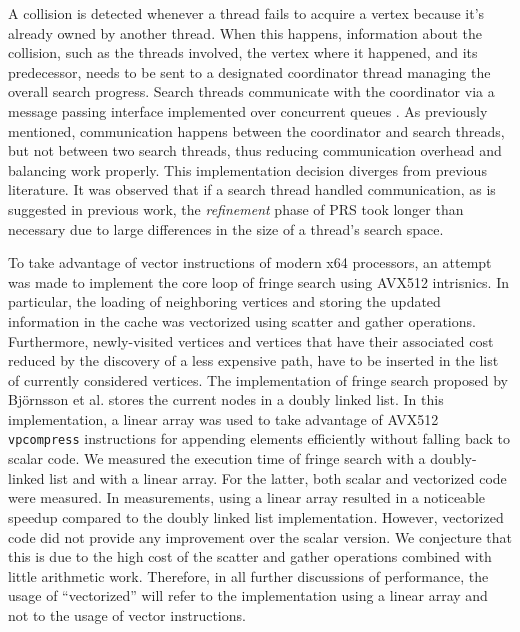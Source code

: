 A collision is detected whenever a thread fails to acquire a vertex because it's already owned by another thread.
When this happens, information about the collision, such as the threads involved, the vertex where it happened, and its predecessor, needs to be sent to a designated coordinator thread managing the overall search progress.
Search threads communicate with the coordinator via a message passing interface implemented over concurrent queues \cite{oneTBB}.
As previously mentioned, communication happens between the coordinator and search threads, but not between two search threads, thus reducing communication overhead and balancing work properly.
This implementation decision diverges from previous literature. It was observed that if a search thread handled communication, as is suggested in previous work, the \textit{refinement} phase of PRS took longer than necessary due to large differences in the size of a thread's search space.

To take advantage of vector instructions of modern x64 processors, an attempt was made to implement the core loop of fringe search using AVX512 intrisnics. 
In particular, the loading of neighboring vertices and storing the updated information in the cache was vectorized using scatter and gather operations.
Furthermore, newly-visited vertices and vertices that have their associated cost reduced by the discovery of a less expensive path, have to be inserted in the list of currently considered vertices.
The implementation of fringe search proposed by Bj\"ornsson et al. \cite{Fringe} stores the current nodes in a doubly linked list.
In this implementation, a linear array was used to take advantage of AVX512 \verb|vpcompress| instructions for appending elements efficiently without falling back to scalar code.
We measured the execution time of fringe search with a doubly-linked list and with a linear array. For the latter, both scalar and vectorized code were measured.
In measurements, using a linear array resulted in a noticeable speedup compared to the doubly linked list implementation. However, vectorized code did not provide any improvement over the scalar version.
We conjecture that this is due to the high cost of the scatter and gather operations combined with little arithmetic work.   
Therefore, in all further discussions of performance, the usage of ``vectorized'' will refer to the implementation using a linear array and not to the usage of vector instructions.
